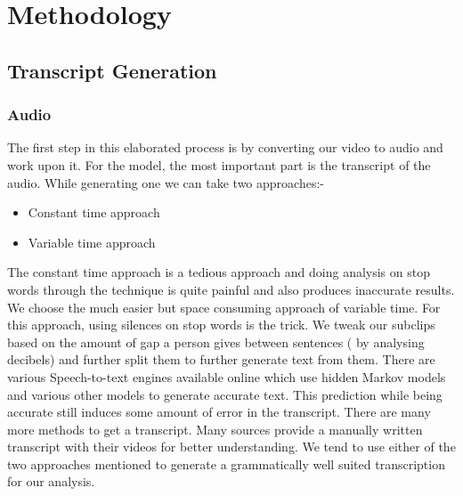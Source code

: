 \documentclass[conference]{IEEEtran}
\begin{document}
\section{Methodology}
\subsection{Transcript Generation}
\subsubsection{Audio}
The first step in this elaborated process is by converting our video to audio and work upon it. For the model, the most important part is the transcript of the audio. While generating one we can take two approaches:-
\begin{itemize}
\item Constant time approach
\item Variable time approach
\end{itemize}

The constant time approach is a tedious approach and doing analysis on stop words through the technique is quite painful and also produces inaccurate results. We choose the much easier but space consuming approach of variable time. For this approach, using silences on stop words is the trick. We tweak our subclips based on the amount of gap a person gives between sentences ( by analysing decibels) and further split them to further generate text from them. There are various Speech-to-text engines available online which use hidden Markov models and various other models to generate accurate text. This prediction while being accurate still induces some amount of error in the transcript. There are many more methods to get a transcript. Many sources provide a manually written transcript with their videos for better understanding. We tend to use either of the two approaches mentioned to generate a grammatically well suited transcription for our analysis.\\
\end{document}
